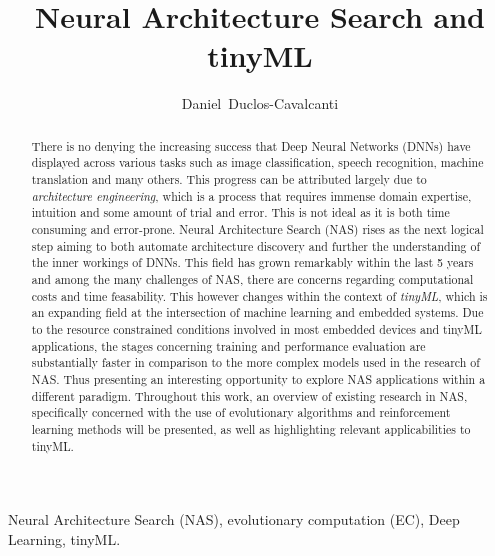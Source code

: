 \documentclass[10pt,        %
               a4paper,     %
               journal,     %
               ]{IEEEtran}
\makeatletter
\def\markboth#1#2{\def\leftmark{\@IEEEcompsoconly{\sffamily}\MakeUppercase{\protect#1}}%
\def\rightmark{\@IEEEcompsoconly{\sffamily}\MakeUppercase{\protect#2}}}
\makeatother
\begin{document}
%
\title{Neural Architecture Search and tinyML}
\author{Daniel~Duclos-Cavalcanti}

\markboth{Seminar for VLSI Entwurfsverfahren, Summer Term 2022}%
{Daniel Duclos-Cavalcanti: Network Architecture Search (NAS)}

\maketitle


\begin{abstract}
There is no denying the increasing success that Deep Neural Networks (DNNs)
have displayed across various tasks such as image classification, speech recognition, machine translation
and many others. This progress can be attributed largely due to \textit{architecture engineering},
which is a process that requires immense domain expertise, intuition and some amount of trial
and error. This is not ideal as it is both time consuming and error-prone. Neural Architecture Search (NAS)
rises as the next logical step aiming to both automate architecture discovery and further the understanding
of the inner workings of DNNs. This field has grown remarkably within the last 5 years and among the many challenges
of NAS, there are concerns regarding computational costs and time feasability. This however changes within the context
of \textit{tinyML}, which is an expanding field at the intersection of machine learning and embedded systems.
Due to the resource constrained conditions involved in most embedded devices and tinyML
applications, the stages concerning training and performance evaluation are substantially faster in comparison to
the more complex models used in the research of NAS. Thus presenting an interesting opportunity to explore NAS applications
within a different paradigm. Throughout this work, an overview of existing research in NAS, specifically concerned
with the use of evolutionary algorithms and reinforcement learning methods will be presented, as well
as highlighting relevant applicabilities to tinyML.

\end{abstract}

\begin{IEEEkeywords}
Neural Architecture Search (NAS), evolutionary computation (EC), Deep Learning, tinyML.
\end{IEEEkeywords}
\end{document}
